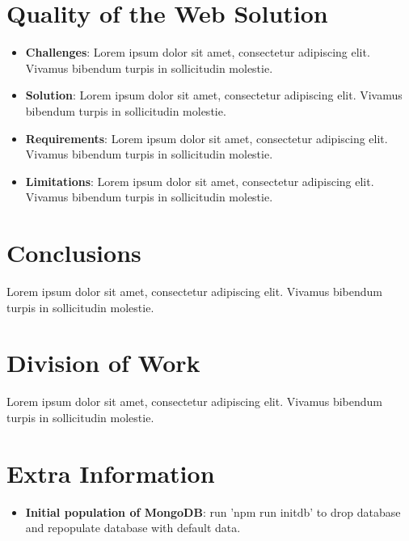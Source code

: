 \documentclass[11pt, a4paper]{article}
\begin{document}
\section{Quality of the Web Solution}
\begin{itemize}
  \item \textbf{Challenges}: Lorem ipsum dolor sit amet, consectetur adipiscing elit. Vivamus
  bibendum turpis in sollicitudin molestie.
  \item \textbf{Solution}: Lorem ipsum dolor sit amet, consectetur adipiscing elit. Vivamus bibendum
  turpis in sollicitudin molestie.
  \item \textbf{Requirements}: Lorem ipsum dolor sit amet, consectetur adipiscing elit. Vivamus
  bibendum turpis in sollicitudin molestie.
  \item \textbf{Limitations}: Lorem ipsum dolor sit amet, consectetur adipiscing elit. Vivamus
  bibendum turpis in sollicitudin molestie.
\end{itemize}

\section{Conclusions}
Lorem ipsum dolor sit amet, consectetur adipiscing elit. Vivamus bibendum turpis in sollicitudin
molestie.

\section{Division of Work}
Lorem ipsum dolor sit amet, consectetur adipiscing elit. Vivamus bibendum turpis in sollicitudin
molestie.

\section{Extra Information}
\begin{itemize}
  \item \textbf{Initial population of MongoDB}: run 'npm run initdb' to drop database and
  repopulate database with default data.
\end{itemize}
\end{document}
